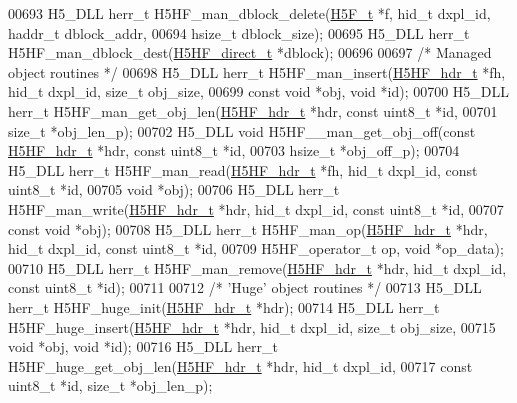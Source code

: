 \begin{DoxyCode}
00693 H5\_DLL herr\_t H5HF\_man\_dblock\_delete(\hyperlink{struct_h5_f__t}{H5F\_t} *f, hid\_t dxpl\_id, haddr\_t dblock\_addr,
00694     hsize\_t dblock\_size);
00695 H5\_DLL herr\_t H5HF\_man\_dblock\_dest(\hyperlink{struct_h5_h_f__direct__t}{H5HF\_direct\_t} *dblock);
00696 
00697 \textcolor{comment}{/* Managed object routines */}
00698 H5\_DLL herr\_t H5HF\_man\_insert(\hyperlink{struct_h5_h_f__hdr__t}{H5HF\_hdr\_t} *fh, hid\_t dxpl\_id, \textcolor{keywordtype}{size\_t} obj\_size,
00699     \textcolor{keyword}{const} \textcolor{keywordtype}{void} *obj, \textcolor{keywordtype}{void} *\textcolor{keywordtype}{id});
00700 H5\_DLL herr\_t H5HF\_man\_get\_obj\_len(\hyperlink{struct_h5_h_f__hdr__t}{H5HF\_hdr\_t} *hdr, \textcolor{keyword}{const} uint8\_t *\textcolor{keywordtype}{id},
00701     \textcolor{keywordtype}{size\_t} *obj\_len\_p);
00702 H5\_DLL \textcolor{keywordtype}{void} H5HF\_\_man\_get\_obj\_off(\textcolor{keyword}{const} \hyperlink{struct_h5_h_f__hdr__t}{H5HF\_hdr\_t} *hdr, \textcolor{keyword}{const} uint8\_t *\textcolor{keywordtype}{id},
00703     hsize\_t *obj\_off\_p);
00704 H5\_DLL herr\_t H5HF\_man\_read(\hyperlink{struct_h5_h_f__hdr__t}{H5HF\_hdr\_t} *fh, hid\_t dxpl\_id, \textcolor{keyword}{const} uint8\_t *\textcolor{keywordtype}{id},
00705     \textcolor{keywordtype}{void} *obj);
00706 H5\_DLL herr\_t H5HF\_man\_write(\hyperlink{struct_h5_h_f__hdr__t}{H5HF\_hdr\_t} *hdr, hid\_t dxpl\_id, \textcolor{keyword}{const} uint8\_t *\textcolor{keywordtype}{id},
00707     \textcolor{keyword}{const} \textcolor{keywordtype}{void} *obj);
00708 H5\_DLL herr\_t H5HF\_man\_op(\hyperlink{struct_h5_h_f__hdr__t}{H5HF\_hdr\_t} *hdr, hid\_t dxpl\_id, \textcolor{keyword}{const} uint8\_t *\textcolor{keywordtype}{id},
00709     H5HF\_operator\_t op, \textcolor{keywordtype}{void} *op\_data);
00710 H5\_DLL herr\_t H5HF\_man\_remove(\hyperlink{struct_h5_h_f__hdr__t}{H5HF\_hdr\_t} *hdr, hid\_t dxpl\_id, \textcolor{keyword}{const} uint8\_t *\textcolor{keywordtype}{id});
00711 
00712 \textcolor{comment}{/* 'Huge' object routines */}
00713 H5\_DLL herr\_t H5HF\_huge\_init(\hyperlink{struct_h5_h_f__hdr__t}{H5HF\_hdr\_t} *hdr);
00714 H5\_DLL herr\_t H5HF\_huge\_insert(\hyperlink{struct_h5_h_f__hdr__t}{H5HF\_hdr\_t} *hdr, hid\_t dxpl\_id, \textcolor{keywordtype}{size\_t} obj\_size,
00715     \textcolor{keywordtype}{void} *obj, \textcolor{keywordtype}{void} *\textcolor{keywordtype}{id});
00716 H5\_DLL herr\_t H5HF\_huge\_get\_obj\_len(\hyperlink{struct_h5_h_f__hdr__t}{H5HF\_hdr\_t} *hdr, hid\_t dxpl\_id,
00717     \textcolor{keyword}{const} uint8\_t *\textcolor{keywordtype}{id}, \textcolor{keywordtype}{size\_t} *obj\_len\_p);

\end{DoxyCode}
